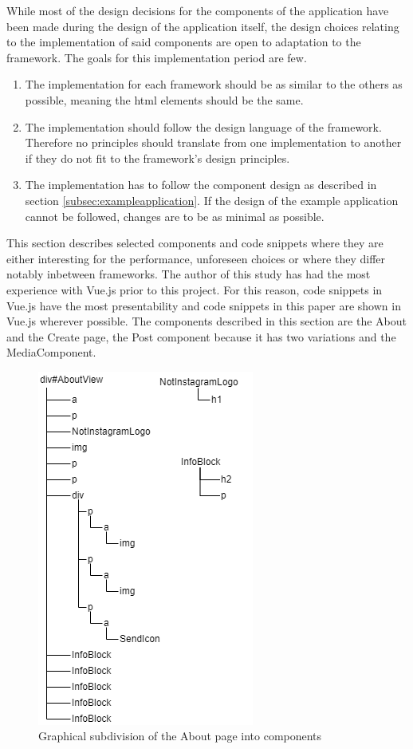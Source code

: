 \documentclass[a4paper, 12pt]{article}
\begin{document}
While most of the design decisions for the components of the application have been made during the design of the application itself, the design choices relating to the implementation of said components are open to adaptation to the framework.
The goals for this implementation period are few.

\begin{enumerate}
  \item The implementation for each framework should be as similar to the others as possible, meaning the \acrshort{html} elements should be the same.
  \item The implementation should follow the design language of the framework.
  Therefore no principles should translate from one implementation to another if they do not fit to the framework's design principles.
  \item The implementation has to follow the component design as described in section \ref{subsec:exampleapplication}.
  If the design of the example application cannot be followed, changes are to be as minimal as possible.
\end{enumerate}

This section describes selected components and code snippets where they are either interesting for the performance, unforeseen choices or where they differ notably inbetween frameworks.
The author of this study has had the most experience with Vue.js prior to this project.
For this reason, code snippets in Vue.js have the most presentability and code snippets in this paper are shown in Vue.js wherever possible.
The components described in this section are the About and the Create page, the Post component because it has two variations and the MediaComponent.

\begin{figure}[h!]
  \begin{center}
  \includegraphics[width=0.4\linewidth, keepaspectratio]{diagrams/about-dom-2.png}
  \end{center}
  \caption{Graphical subdivision of the About page into components}\label{fig:graphicalAboutPage}
\end{figure}
\end{document}
